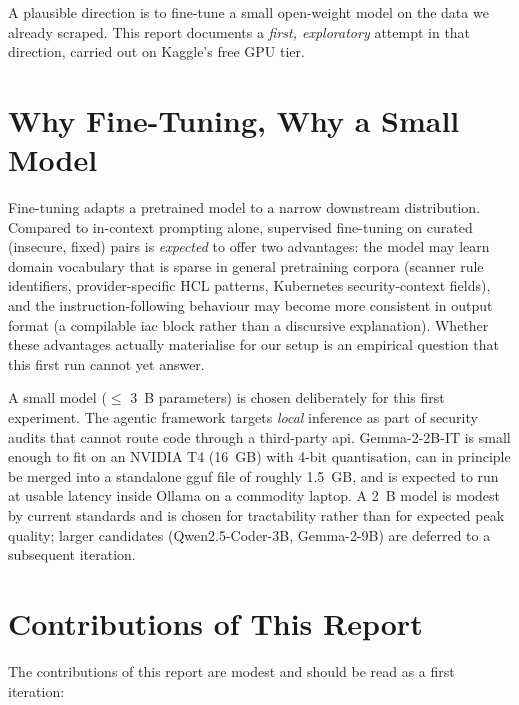 \documentclass[12pt, a4paper]{report}
\begin{document}
A plausible direction is to fine-tune a small open-weight model on the
data we already scraped. This report documents a \emph{first, exploratory}
attempt in that direction, carried out on Kaggle's free GPU tier.

\section{Why Fine-Tuning, Why a Small Model}

Fine-tuning adapts a pretrained model to a narrow downstream distribution.
Compared to in-context prompting alone, supervised fine-tuning on curated
(insecure, fixed) pairs is \emph{expected} to offer two advantages: the
model may learn domain vocabulary that is sparse in general pretraining
corpora (scanner rule identifiers, provider-specific HCL patterns,
Kubernetes security-context fields), and the instruction-following
behaviour may become more consistent in output format (a compilable
\gls{iac} block rather than a discursive explanation). Whether these
advantages actually materialise for our setup is an empirical question
that this first run cannot yet answer.

A small model (\(\leq\) 3~B parameters) is chosen deliberately for this
first experiment. The agentic framework targets \emph{local} inference as
part of security audits that cannot route code through a third-party
\gls{api}. Gemma-2-2B-IT is small enough to fit on an NVIDIA T4 (16~GB)
with 4-bit quantisation, can in principle be merged into a standalone
\gls{gguf} file of roughly 1.5~GB, and is expected to run at usable
latency inside Ollama on a commodity laptop. A 2~B model is modest by
current standards and is chosen for tractability rather than for expected
peak quality; larger candidates (Qwen2.5-Coder-3B, Gemma-2-9B) are
deferred to a subsequent iteration.

\section{Contributions of This Report}

The contributions of this report are modest and should be read as a
first iteration:
\end{document}
